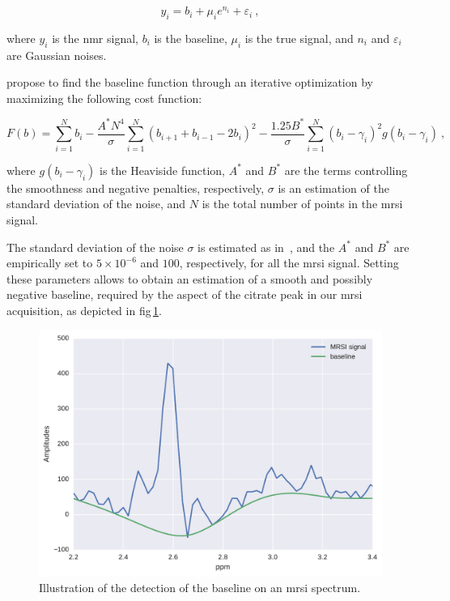 \begin{equation}
  y_i = b_i + \mu_i e^{n_i} + \varepsilon_i \ ,
  \label{eq:methodBaselineDetectionModel}
\end{equation}

\noindent where $y_i$ is the \ac{nmr} signal, $b_i$ is the baseline, $\mu_i$ is the true signal, and $n_i$ and $\varepsilon_i$ are Gaussian noises.

\citeauthor{xi2008baseline} propose to find the baseline function through an iterative optimization by maximizing the following cost function:

\begin{equation}
  F(b) = \sum_{i = 1}^{N} b_i - \frac{A^{*} N^4}{\sigma} \sum_{i = 1}^{N} (b_{i+1} + b_{i-1} - 2 b_i)^2 - \frac{1.25 B^{*}}{\sigma} \sum_{i = 1}^{N} (b_i - \gamma_i)^2 g(b_i - \gamma_i) \ ,
  \label{eq:methodBaselineDetectionCostFunction}
\end{equation}

\noindent where $g(b_i - \gamma_i)$ is the Heaviside function, $A^*$ and $B^*$ are the terms controlling the smoothness and negative penalties, respectively, $\sigma$ is an estimation of the standard deviation of the noise, and $N$ is the total number of points in the \ac{mrsi} signal.

The standard deviation of the noise $\sigma$ is estimated as in~\cite{xi2008baseline}, and the $A^{*}$ and $B^{*}$ are empirically set to $5 \times 10^{-6}$ and $100$, respectively, for all the \ac{mrsi} signal.
Setting these parameters allows to obtain an estimation of a smooth and possibly negative baseline, required by the aspect of the citrate peak in our \ac{mrsi} acquisition, as depicted in \acs{fig}\,\ref{fig:baselinemrsi}.

\begin{figure}
  \centering
  \includegraphics[width=0.5\linewidth]{6_pipeline/figures/baseline_mrsi.pdf}
  \caption{Illustration of the detection of the baseline on an \acs*{mrsi} spectrum.}
  \label{fig:baselinemrsi}
\end{figure}

